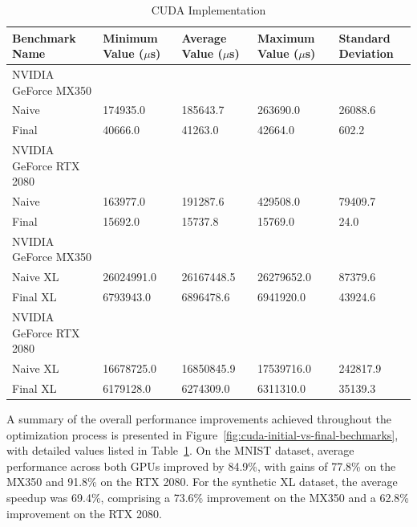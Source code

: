 \documentclass[modern,longauthor]{aastex7}
\begin{document}
\begin{table}[htb!]
\centering
\caption{CUDA Implementation\label{tab:cuda-initial-vs-final-benchmarks}}
\begin{tabular}{p{5.5cm} p{2cm} p{2cm} p{2cm} p{2cm}}
\hline
Benchmark Name & Minimum Value ($\mu$s) & Average Value ($\mu$s) & Maximum Value ($\mu$s) & Standard Deviation \\
\hline
NVIDIA GeForce MX350 \\
\hspace{0.5cm}Naive & 174935.0 & 185643.7 & 263690.0 & 26088.6 \\
\hspace{0.5cm}Final & 40666.0 & 41263.0 & 42664.0 & 602.2 \\
NVIDIA GeForce RTX 2080 \\
\hspace{0.5cm}Naive & 163977.0 & 191287.6 & 429508.0 & 79409.7 \\
\hspace{0.5cm}Final & 15692.0 & 15737.8 & 15769.0 & 24.0 \\
\hline
NVIDIA GeForce MX350 \\
\hspace{0.5cm}Naive XL & 26024991.0 & 26167448.5 & 26279652.0 & 87379.6 \\
\hspace{0.5cm}Final XL & 6793943.0 & 6896478.6 & 6941920.0 & 43924.6 \\
NVIDIA GeForce RTX 2080 \\
\hspace{0.5cm}Naive XL & 16678725.0 & 16850845.9 & 17539716.0 & 242817.9 \\
\hspace{0.5cm}Final XL & 6179128.0 & 6274309.0 & 6311310.0 & 35139.3 \\
\hline
\end{tabular}
\end{table}
\FloatBarrier

A summary of the overall performance improvements achieved throughout the optimization process is presented in Figure~\ref{fig:cuda-initial-vs-final-bechmarks}, with detailed values listed in Table~\ref{tab:cuda-initial-vs-final-benchmarks}. On the MNIST dataset, average performance across both GPUs improved by 84.9\%, with gains of 77.8\% on the MX350 and 91.8\% on the RTX 2080. For the synthetic XL dataset, the average speedup was 69.4\%, comprising a 73.6\% improvement on the MX350 and a 62.8\% improvement on the RTX 2080.
\end{document}
